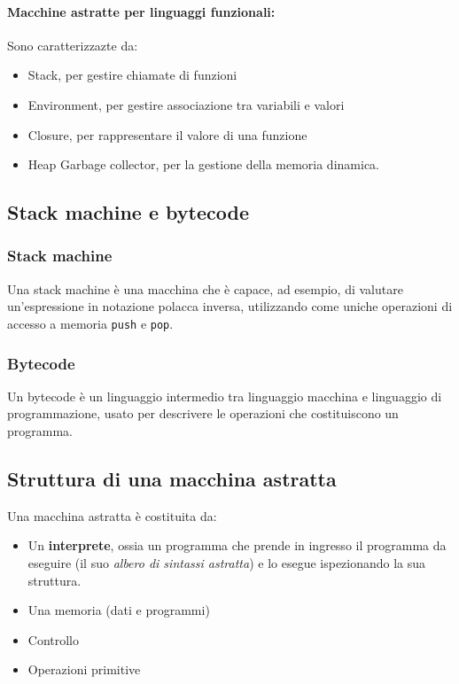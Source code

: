 \documentclass[a4paper,10pt]{article}
\begin{document}
\paragraph{Macchine astratte per linguaggi funzionali:} Sono caratterizzazte da:
\begin{itemize}
 \item Stack, per gestire chiamate di funzioni
 \item Environment, per gestire associazione tra variabili e valori
 \item Closure, per rappresentare il valore di una funzione
 \item Heap Garbage collector, per la gestione della memoria dinamica.
\end{itemize}

\subsection{Stack machine e bytecode}

\subsubsection{Stack machine}
Una stack machine è una macchina che è capace, ad esempio, di valutare un'espressione in notazione polacca inversa, utilizzando come uniche operazioni di accesso a memoria \texttt{push} e \texttt{pop}.

\subsubsection{Bytecode}
Un bytecode è un linguaggio intermedio tra linguaggio macchina e linguaggio di programmazione, usato per descrivere le operazioni che costituiscono un programma.


\newpage\subsection{Struttura di una macchina astratta}
Una macchina astratta è costituita da:
\begin{itemize}
 \item Un \textbf{interprete}, ossia un programma che prende in ingresso il programma da eseguire (il suo \emph{albero di sintassi astratta}) e lo esegue ispezionando la sua struttura.
 \item Una memoria (dati e programmi)
 \item Controllo
 \item Operazioni primitive
\end{itemize}
\end{document}

